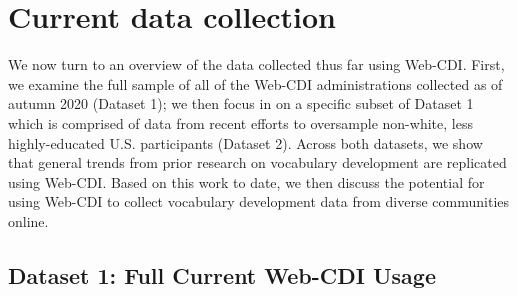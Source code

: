 \documentclass[
  english,
  ,man,floatsintext]{apa6}
\begin{document}
\hypertarget{current-data-collection}{%
\section{Current data collection}\label{current-data-collection}}

We now turn to an overview of the data collected thus far using Web-CDI. First, we examine the full sample of all of the Web-CDI administrations collected as of autumn 2020 (Dataset 1); we then focus in on a specific subset of Dataset 1 which is comprised of data from recent efforts to oversample non-white, less highly-educated U.S. participants (Dataset 2). Across both datasets, we show that general trends from prior research on vocabulary development are replicated using Web-CDI. Based on this work to date, we then discuss the potential for using Web-CDI to collect vocabulary development data from diverse communities online.

\hypertarget{dataset-1-full-current-web-cdi-usage}{%
\subsection{Dataset 1: Full Current Web-CDI Usage}\label{dataset-1-full-current-web-cdi-usage}}

\begin{table}

\caption{\label{tab:unnamed-chunk-1}Exclusions from Dataset 1: full Web-CDI sample}
\centering
{}
\end{table}
\end{document}
